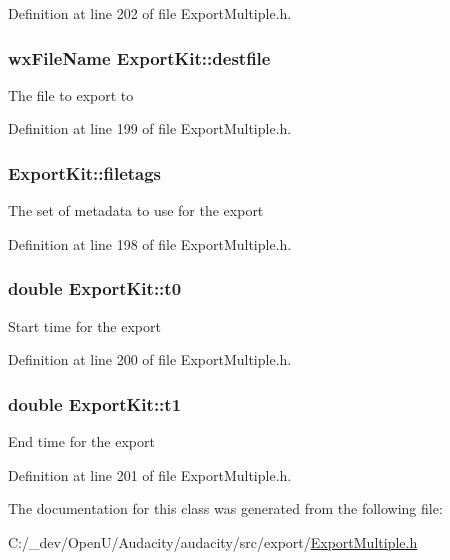 Definition at line 202 of file Export\+Multiple.\+h.

\subsubsection[{\texorpdfstring{destfile}{destfile}}]{\setlength{\rightskip}{0pt plus 5cm}wx\+File\+Name Export\+Kit\+::destfile}\hypertarget{class_export_kit_a4ab0ccd67ed05eb6b745d2e6b736c68d}{}\label{class_export_kit_a4ab0ccd67ed05eb6b745d2e6b736c68d}
The file to export to 

Definition at line 199 of file Export\+Multiple.\+h.

\subsubsection[{\texorpdfstring{filetags}{filetags}}]{ Export\+Kit\+::filetags}\hypertarget{class_export_kit_a3e95396f3a12807aca13b7596a9e760d}{}\label{class_export_kit_a3e95396f3a12807aca13b7596a9e760d}
The set of metadata to use for the export 

Definition at line 198 of file Export\+Multiple.\+h.

\subsubsection[{\texorpdfstring{t0}{t0}}]{\setlength{\rightskip}{0pt plus 5cm}double Export\+Kit\+::t0}\hypertarget{class_export_kit_a7b4eb446ba0c07b99f86a703f5411172}{}\label{class_export_kit_a7b4eb446ba0c07b99f86a703f5411172}
Start time for the export 

Definition at line 200 of file Export\+Multiple.\+h.

\subsubsection[{\texorpdfstring{t1}{t1}}]{\setlength{\rightskip}{0pt plus 5cm}double Export\+Kit\+::t1}\hypertarget{class_export_kit_a546b007168c1ebb19163a0c1bd74f97c}{}\label{class_export_kit_a546b007168c1ebb19163a0c1bd74f97c}
End time for the export 

Definition at line 201 of file Export\+Multiple.\+h.



The documentation for this class was generated from the following file\+:\begin{DoxyCompactItemize}
\item 
C\+:/\+\_\+dev/\+Open\+U/\+Audacity/audacity/src/export/\hyperlink{_export_multiple_8h}{Export\+Multiple.\+h}\end{DoxyCompactItemize}
